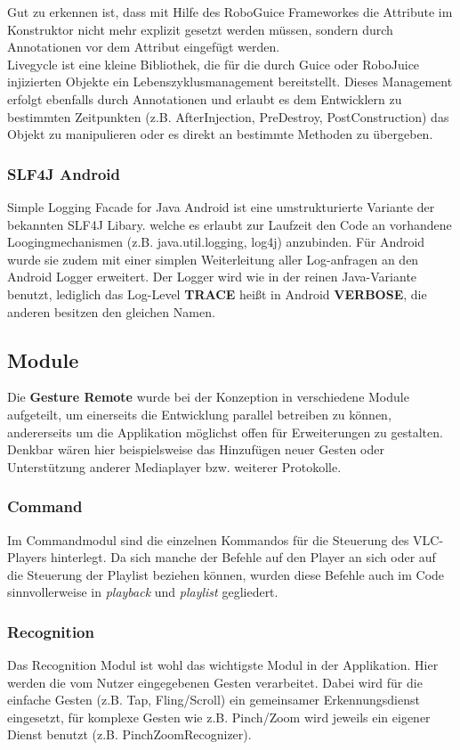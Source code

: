 \documentclass[a4paper,12pt]{article}
\begin{document}
Gut zu erkennen ist, dass mit Hilfe des RoboGuice Frameworkes die Attribute im Konstruktor nicht mehr explizit gesetzt werden müssen, sondern durch Annotationen vor dem Attribut eingefügt werden.\\
Livegycle ist eine kleine Bibliothek, die für die durch Guice oder RoboJuice injizierten Objekte ein Lebenszyklusmanagement bereitstellt. Dieses Management erfolgt ebenfalls durch Annotationen und erlaubt es dem Entwicklern zu bestimmten Zeitpunkten (z.B. AfterInjection, PreDestroy, PostConstruction) das Objekt zu manipulieren oder es direkt an bestimmte Methoden zu übergeben.\cite{lifegycle-libaries}

\subsubsection{SLF4J Android}
Simple Logging Facade for Java Android ist eine umstrukturierte Variante der bekannten SLF4J Libary. welche es erlaubt zur Laufzeit den Code an vorhandene Loogingmechanismen (z.B. java.util.logging, log4j) anzubinden. Für Android wurde sie zudem mit einer simplen Weiterleitung aller Log-anfragen an den Android Logger erweitert. Der Logger wird wie in der reinen Java-Variante benutzt, lediglich das Log-Level \textbf{TRACE} heißt in Android \textbf{VERBOSE}, die anderen besitzen den gleichen Namen. \cite{sfl4j-android-libaries}
\subsection{Module}

Die \textbf{Gesture Remote} wurde bei der Konzeption in verschiedene Module aufgeteilt, um einerseits die Entwicklung parallel betreiben zu können, andererseits um die Applikation möglichst offen für Erweiterungen zu gestalten. Denkbar wären hier beispielsweise das Hinzufügen neuer Gesten oder Unterstützung anderer Mediaplayer bzw. weiterer Protokolle. 

\subsubsection{Command}
Im Commandmodul sind die einzelnen Kommandos für die Steuerung des VLC-Players hinterlegt. Da sich manche der Befehle auf den Player an sich oder auf die Steuerung der Playlist beziehen können, wurden diese Befehle auch im Code sinnvollerweise in \textit{playback} und \textit{playlist} gegliedert.
\subsubsection{Recognition}
Das Recognition Modul ist wohl das wichtigste Modul in der Applikation. Hier werden die vom Nutzer eingegebenen Gesten verarbeitet. Dabei wird für die einfache Gesten (z.B. Tap, Fling/Scroll) ein gemeinsamer Erkennungsdienst eingesetzt, für komplexe Gesten wie z.B. Pinch/Zoom wird jeweils ein eigener Dienst benutzt (z.B. PinchZoomRecognizer).
\end{document}
